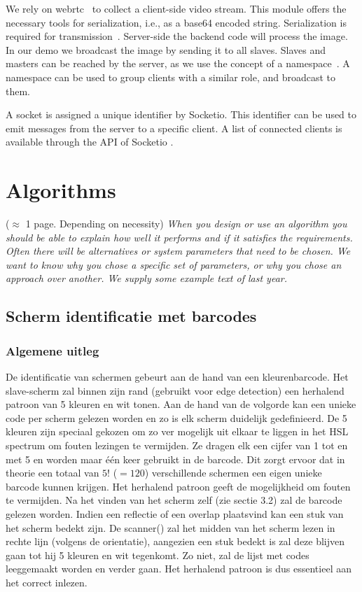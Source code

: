 \documentclass[a4paper,11pt]{article}
\newcommand{\note}[1]{{\colorbox{yellow!40!white}{#1}}}
\newcommand{\exampletext}[1]{{\color{blue!60!black}#1}}
\begin{document}
\exampletext{We rely on webrtc~\cite{website:webrtc} to collect a client-side video stream. This module offers the necessary tools for serialization, i.e., as a base64 encoded string. Serialization is required for transmission~\cite{website:serialization}. Server-side the backend code will process the image. In our demo we broadcast the image by sending it to all slaves. Slaves and masters can be reached by the server, as we use the concept of a namespace~\cite{website:namespaces}. A namespace can be used to group clients with a similar role, and broadcast to them. 

A socket is assigned a unique identifier by Socketio. This identifier can be used to emit messages from the server to a specific client. A list of connected clients is available through the API of Socketio \cite{website:socketio-clients}.}

\section{Algorithms}\label{sec:technical-analysis}

\note{($\approx$ 1 page. Depending on necessity)}
\exampletext{\textit{When you design or use an algorithm you should be able to explain how well it performs and if it satisfies the requirements. Often there will be alternatives or system parameters that need to be chosen. We want to know why you chose a specific set of parameters, or why you chose an approach over another. We supply some example text of last year.}}



\subsection{Scherm identificatie met barcodes}

\subsubsection{Algemene uitleg}

De identificatie van schermen gebeurt aan de hand van een kleurenbarcode. Het slave-scherm zal binnen zijn rand (gebruikt voor edge detection) een herhalend patroon van 5 kleuren en wit tonen. Aan de hand van de volgorde kan een unieke code per scherm gelezen worden en zo is elk scherm duidelijk gedefinieerd. De 5 kleuren zijn speciaal gekozen om zo ver mogelijk uit elkaar te liggen in het HSL spectrum om fouten lezingen te vermijden. Ze dragen elk een cijfer van 1 tot en met 5 en worden maar één keer gebruikt in de barcode. Dit zorgt ervoor dat in theorie een totaal van $5!$ ($=120$) verschillende schermen een eigen unieke barcode kunnen krijgen. Het herhalend patroon geeft de mogelijkheid om fouten te vermijden. Na het vinden van het scherm zelf (zie sectie 3.2) zal de barcode gelezen worden. Indien een reflectie of een overlap plaatsvind kan een stuk van het scherm bedekt zijn. De scanner() zal het midden van het scherm lezen in rechte lijn (volgens de orientatie), aangezien een stuk bedekt is zal deze blijven gaan tot hij 5 kleuren en wit tegenkomt. Zo niet, zal de lijst met codes leeggemaakt worden en verder gaan. Het herhalend patroon is dus essentieel aan het correct inlezen.
\end{document}
